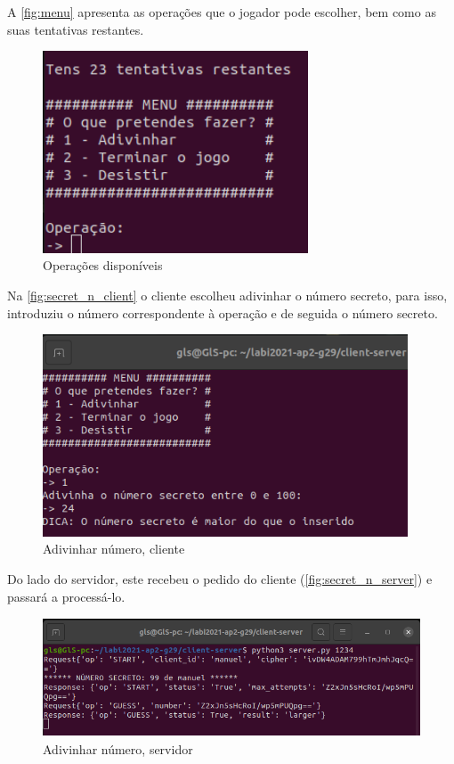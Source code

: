 \documentclass{report}
\begin{document}
A \autoref{fig:menu} apresenta as operações que o jogador pode escolher, bem como as suas tentativas restantes.

\begin{figure}[!h]
\center 
\includegraphics[height=170pt]{img/fotos_resultado/menu.png}
\caption{Operações disponíveis}
\label{fig:menu}
\end{figure}

Na \autoref{fig:secret_n_client} o cliente escolheu adivinhar o número secreto, para isso, introduziu o número correspondente à operação e de seguida o número secreto.

\begin{figure}[!h]
\center 
\includegraphics[height=170pt]{img/fotos_resultado/guess_client.png}
\caption{Adivinhar número, cliente}
\label{fig:secret_n_client}
\end{figure}

Do lado do servidor, este recebeu o pedido do cliente (\autoref{fig:secret_n_server}) e passará a processá-lo.

\begin{figure}[!h]
\center 
\includegraphics[height=100pt]{img/fotos_resultado/guess_server.png}
\caption{Adivinhar número, servidor}
\label{fig:secret_n_server}
\end{figure}
\end{document}
